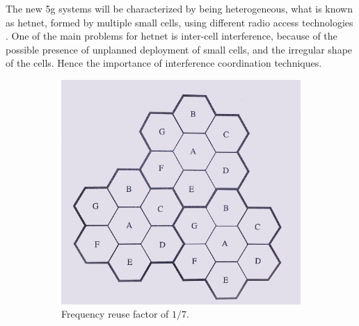 The new \gls{5g} systems will be characterized by being heterogeneous, what is
known as \gls{hetnet}, formed by multiple small cells, using different radio
access technologies \cite{chin14}. One of the main problems for \gls{hetnet} is
inter-cell interference, because of the possible presence of unplanned
deployment of small cells, and the irregular shape of the cells. Hence the importance of interference coordination techniques.

\begin{figure}[t]
    \centering
    \begin{subfigure}[b]{0.45\textwidth}
            \includegraphics[width=\textwidth]{./01.introduction/img/frequency_reuse.png}
        \caption{Frequency reuse factor of $1 / 7$.}
        \label{fig:freuse}
    \end{subfigure}
    \begin{subfigure}[b]{0.45\textwidth}

\end{subfigure}
\end{figure}
